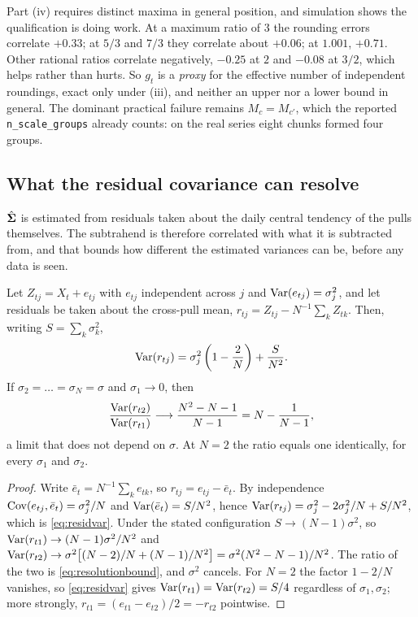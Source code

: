 \documentclass[12pt,a4paper,oneside]{article}
\begin{document}
\begin{remark}\label{rem:generalposition}
Part (iv) requires distinct maxima in general position, and simulation shows the
qualification is doing work. At a maximum ratio of $3$ the rounding errors
correlate $+0.33$; at $5/3$ and $7/3$ they correlate about $+0.06$; at $1.001$,
$+0.71$. Other rational ratios correlate negatively, $-0.25$ at $2$ and $-0.08$ at
$3/2$, which helps rather than hurts. So $g_t$ is a \emph{proxy} for the effective
number of independent roundings, exact only under (iii), and neither an upper nor
a lower bound in general. The dominant practical failure remains $M_c=M_{c'}$,
which the reported \texttt{n\_scale\_groups} already counts: on the real series
eight chunks formed four groups.
\end{remark}

\subsection{What the residual covariance can resolve}\label{app:resolution}

$\hat{\bm{\Sigma}}$ is estimated from residuals taken about the daily central tendency of
the pulls themselves. The subtrahend is therefore correlated with what it is
subtracted from, and that bounds how different the estimated variances can be,
before any data is seen.

\begin{proposition}
\label{prop:resolution}
Let $Z_{tj}=X_t+e_{tj}$ with $e_{tj}$ independent across $j$ and
$\operatorname{Var}(e_{tj})=\sigma_j^2$, and let residuals be taken about the cross-pull mean,
$r_{tj}=Z_{tj}-N^{-1}\sum_k Z_{tk}$. Then, writing $S=\sum_k\sigma_k^2$,
\begin{equation}
\operatorname{Var}(r_{tj})=\sigma_j^2\left(1-\frac{2}{N}\right)+\frac{S}{N^2}.
\label{eq:residvar}
\end{equation}
If $\sigma_2=\dots=\sigma_N=\sigma$ and $\sigma_1\to 0$, then
\begin{equation}
\frac{\operatorname{Var}(r_{t2})}{\operatorname{Var}(r_{t1})}\longrightarrow
\frac{N^2-N-1}{N-1}=N-\frac{1}{N-1},
\label{eq:resolutionbound}
\end{equation}
a limit that does not depend on $\sigma$. At $N=2$ the ratio equals one
identically, for every $\sigma_1$ and $\sigma_2$.
\end{proposition}

\begin{proof}
Write $\bar{e}_t=N^{-1}\sum_k e_{tk}$, so $r_{tj}=e_{tj}-\bar{e}_t$. By
independence $\operatorname{Cov}(e_{tj},\bar{e}_t)=\sigma_j^2/N$ and $\operatorname{Var}(\bar{e}_t)=S/N^2$,
hence
$\operatorname{Var}(r_{tj})=\sigma_j^2-2\sigma_j^2/N+S/N^2$, which is \eqref{eq:residvar}.
Under the stated configuration $S\to(N-1)\sigma^2$, so
$\operatorname{Var}(r_{t1})\to(N-1)\sigma^2/N^2$ and
$\operatorname{Var}(r_{t2})\to\sigma^2\bigl[(N-2)/N+(N-1)/N^2\bigr]
=\sigma^2(N^2-N-1)/N^2$. The ratio of the two is \eqref{eq:resolutionbound}, and
$\sigma^2$ cancels. For $N=2$ the factor $1-2/N$ vanishes, so \eqref{eq:residvar}
gives $\operatorname{Var}(r_{t1})=\operatorname{Var}(r_{t2})=S/4$ regardless of $\sigma_1,\sigma_2$; more
strongly, $r_{t1}=(e_{t1}-e_{t2})/2=-r_{t2}$ pointwise.
\end{proof}
\end{document}
